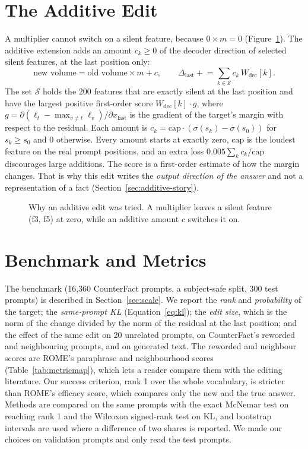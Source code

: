 \section{The Additive Edit}\label{sec:additive-method}

A multiplier cannot switch on a silent feature, because $0\times m=0$ (Figure~\ref{fig:addmath}). The additive extension adds an amount $c_k\ge0$ of the decoder direction of selected silent features, at the last position only:
\begin{equation}\label{eq:add}
\text{new volume}=\text{old volume}\times m+c,\qquad \Delta_{\text{last}}\mathrel{+}=\sum_{k\in\mathcal{S}}c_k\,W_{\mathrm{dec}}[k].
\end{equation}
The set $\mathcal{S}$ holds the 200 features that are exactly silent at the last position and have the largest positive first-order score $W_{\mathrm{dec}}[k]\cdot g$, where $g=\partial(\ell_t-\max_{v\ne t}\ell_v)/\partial x_{\mathrm{last}}$ is the gradient of the target's margin with respect to the residual. Each amount is $c_k=\mathrm{cap}\cdot(\sigma(s_k)-\sigma(s_0))$ for $s_k\ge s_0$ and 0 otherwise. Every amount starts at exactly zero, $\mathrm{cap}$ is the loudest feature on the real prompt positions, and an extra loss $0.005\sum_kc_k/\mathrm{cap}$ discourages large additions. The score is a first-order estimate of how the margin changes. That is why this edit writes the \emph{output direction of the answer} and not a representation of a fact (Section~\ref{sec:additive-story}).

\begin{figure}[!htb]
\centering
{}
\caption[Why an additive edit was tried]{Why an additive edit was tried. A multiplier leaves a silent feature (f3, f5) at zero, while an additive amount $c$ switches it on.}\label{fig:addmath}
\end{figure}

\section{Benchmark and Metrics}\label{sec:bench}

The benchmark (16,360 CounterFact prompts, a subject-safe split, 300 test prompts) is described in Section~\ref{sec:scale}. We report the \emph{rank} and \emph{probability} of the target; the \emph{same-prompt KL} (Equation~\ref{eq:kl}); the \emph{edit size}, which is the norm of the change divided by the norm of the residual at the last position; and the effect of the same edit on 20 unrelated prompts, on CounterFact's reworded and neighbouring prompts, and on generated text. The reworded and neighbour scores are ROME's paraphrase and neighbourhood scores \cite{r2} (Table~\ref{tab:metricmap}), which lets a reader compare them with the editing literature. Our success criterion, rank 1 over the whole vocabulary, is stricter than ROME's efficacy score, which compares only the new and the true answer. Methods are compared on the same prompts with the exact McNemar test \cite{r39} on reaching rank 1 and the Wilcoxon signed-rank test \cite{r40} on KL, and bootstrap intervals \cite{r57} are used where a difference of two shares is reported. We made our choices on validation prompts and only read the test prompts.

